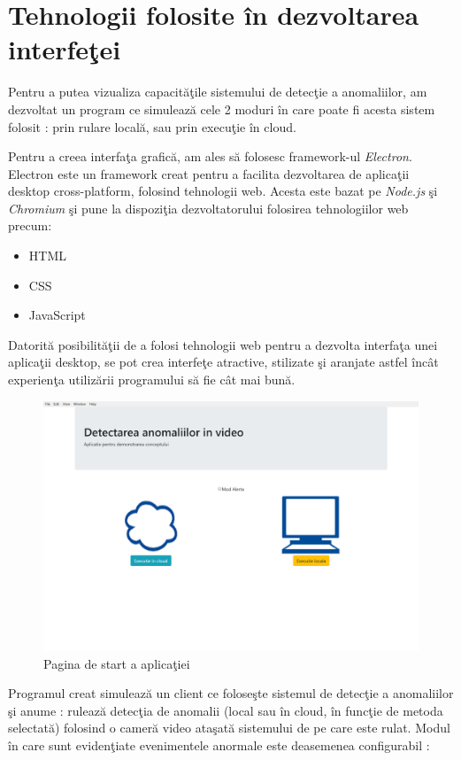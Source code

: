 \documentclass[a4paper,12pt]{report}
\begin{document}
\section {Tehnologii folosite în dezvoltarea interfeţei}
\quad Pentru a putea vizualiza capacităţile sistemului de detecţie a anomaliilor, am dezvoltat un program ce simulează cele 2 moduri în care poate fi acesta sistem folosit : prin rulare locală, sau prin execuţie în cloud.
\par Pentru a creea interfaţa grafică, am ales să folosesc framework-ul \emph{Electron}. Electron este un framework creat pentru a facilita dezvoltarea de aplicaţii desktop cross-platform, folosind tehnologii web. Acesta este bazat pe \emph{Node.js} şi \emph{Chromium} şi pune la dispoziţia dezvoltatorului folosirea tehnologiilor web precum: 
\begin{itemize}
\item{HTML}
\item{CSS}
\item{JavaScript}
\end{itemize}
\par
Datorită posibilităţii de a folosi tehnologii web pentru a dezvolta interfaţa unei aplicaţii desktop, se pot crea interfeţe atractive, stilizate şi aranjate astfel încât experienţa utilizării programului să fie cât mai bună. 
\begin{figure}[h]
\begin{center}
        \includegraphics[width = 1\textwidth]{images/interfata}
			 \caption{Pagina de start a aplicaţiei}
			 \label{fig:interfata}
\end{center}
\end{figure}
\par Programul creat simulează un client ce foloseşte sistemul de detecţie a anomaliilor şi anume : rulează detecţia de anomalii (local sau în cloud, în funcţie de metoda selectată) folosind o cameră video ataşată sistemului de pe care este rulat. Modul în care sunt evidenţiate evenimentele anormale este deasemenea configurabil :
\end{document}

